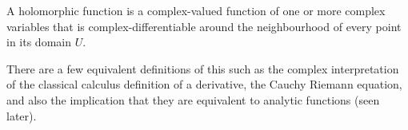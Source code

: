 

\begin{definition}
  \label{def:holfunction}

  A holomorphic function is a complex-valued function of one or more complex variables that is complex-differentiable around the neighbourhood of every point in 
  its domain $U$.

  There are a few equivalent definitions of this such as the complex interpretation of the classical calculus definition of a derivative, 
  the Cauchy Riemann equation, and also the implication that they are equivalent to analytic functions (seen later).
\end{definition}
